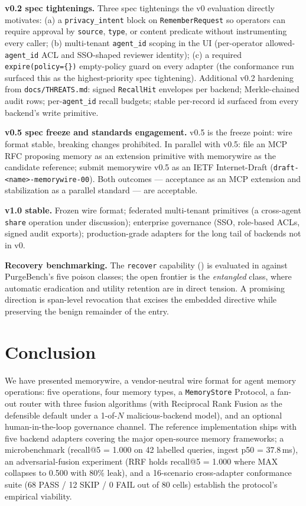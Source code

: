 \documentclass[11pt,letterpaper,twocolumn]{article}
\begin{document}
\textbf{v0.2 spec tightenings.} Three spec tightenings the v0 evaluation directly motivates: (a) a \texttt{privacy\_intent} block on \texttt{RememberRequest} so operators can require approval by \texttt{source}, \texttt{type}, or content predicate without instrumenting every caller; (b) multi-tenant \texttt{agent\_id} scoping in the UI (per-operator allowed-\texttt{agent\_id} ACL and SSO-shaped reviewer identity); (c) a required \texttt{expire(policy=\{\})} empty-policy guard on every adapter (the  conformance run surfaced this as the highest-priority spec tightening). Additional v0.2 hardening from \texttt{docs/THREATS.md}: signed \texttt{RecallHit} envelopes per backend; Merkle-chained audit rows; per-\texttt{agent\_id} recall budgets; stable per-record id surfaced from every backend's write primitive.

\textbf{v0.5 spec freeze and standards engagement.} v0.5 is the freeze point: wire format stable, breaking changes prohibited. In parallel with v0.5: file an MCP RFC proposing memory as an extension primitive with memorywire as the candidate reference; submit memorywire v0.5 as an IETF Internet-Draft (\texttt{draft-<name>-memorywire-00}). Both outcomes --- acceptance as an MCP extension and stabilization as a parallel standard --- are acceptable.

\textbf{v1.0 stable.} Frozen wire format; federated multi-tenant primitives (a cross-agent \texttt{share} operation under discussion); enterprise governance (SSO, role-based ACLs, signed audit exports); production-grade adapters for the long tail of backends not in v0.

\textbf{Recovery benchmarking.} The \texttt{recover} capability () is evaluated in  against PurgeBench's five poison classes; the open frontier is the \emph{entangled} class, where automatic eradication and utility retention are in direct tension. A promising direction is span-level revocation that excises the embedded directive while preserving the benign remainder of the entry.

\section{Conclusion}
\label{sec:conclusion}

We have presented memorywire, a vendor-neutral wire format for agent memory operations: five operations, four memory types, a \texttt{MemoryStore} Protocol, a fan-out router with three fusion algorithms (with Reciprocal Rank Fusion as the defensible default under a 1-of-$N$ malicious-backend model), and an optional human-in-the-loop governance channel. The reference implementation ships with five backend adapters covering the major open-source memory frameworks; a microbenchmark (recall@5 = 1.000 on 42 labelled queries, ingest p50 = 37.8\,ms), an adversarial-fusion experiment (RRF holds recall@5 = 1.000 where MAX collapses to 0.500 with 80\% leak), and a 16-scenario cross-adapter conformance suite (68 PASS / 12 SKIP / 0 FAIL out of 80 cells) establish the protocol's empirical viability.
\end{document}
